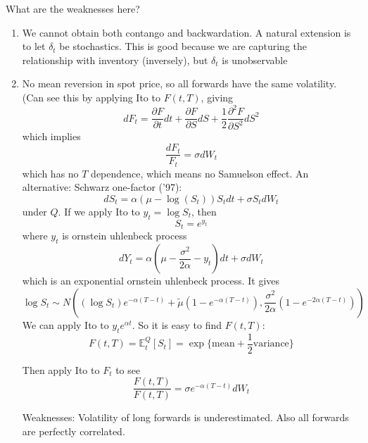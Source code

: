 What are the weaknesses here?
\begin{enumerate}
	\item We cannot obtain both contango and backwardation. A natural extension is to let $\delta_t$ be stochastics. This is good because we are capturing the relationship with inventory (inversely), but $\delta_t$ is unobservable
	\item No mean reversion in spot price, so all forwards have the same volatility. (Can see this by applying Ito to $F(t,T)$, giving
	\begin{equation}
		dF_t = \frac{\partial F}{\partial t}dt + \frac{\partial F}{\partial S}dS + \frac12 \frac{\partial^2 F}{\partial S^2} dS^2
	\end{equation}
	which implies
	\begin{equation}
		\frac{dF_t}{F_t} = \sigma dW_t
	\end{equation}
	which has no $T$ dependence, which means no Samuelson effect.
	An alternative: Schwarz one-factor ('97):
	\begin{equation}
		dS_t = \alpha(\mu - \log(S_t))S_tdt + \sigma S_t dW_t
	\end{equation}
	under $Q$. If we apply Ito to $y_t = \log S_t$, then
	\begin{equation}
		S_t = e^{y_t}
	\end{equation}
	where $y_t$ is ornstein uhlenbeck process
	\begin{equation}
		dY_t = \alpha(\mu - \frac{\sigma^2}{2\alpha} - y_t)dt + \sigma dW_t
	\end{equation}
	which is an exponential ornstein uhlenbeck process. It gives
	\begin{equation}
		\log S_t \sim N( (\log S_t) e^{-\alpha(T-t)} + \tilde{\mu}(1-e^{-\alpha(T-t)}) ,  \frac{\sigma^2}{2\alpha} (1-e^{-2\alpha(T-t)}))
	\end{equation}
	We can apply Ito to $y_te^{\alpha t}$. So it is easy to find $F(t,T)$:
	\begin{equation}
		F(t,T) = \mathbb{E}_t^Q\left[ S_t \right] = \exp \{ \text{mean} + \frac12 \text{variance} \}
	\end{equation}
	
	Then apply Ito to $F_t$ to see
	\begin{equation}
		\frac{F(t,T)}{F(t,T)} = \sigma e^{-\alpha(T-t)}dW_t
	\end{equation}
	
	Weaknesses: Volatility of long forwards is underestimated. Also all forwards are perfectly correlated.
\end{enumerate}

